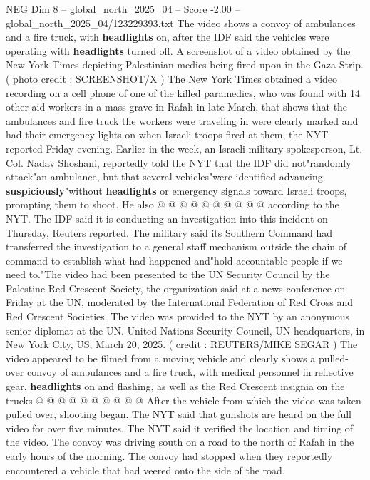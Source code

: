 \begin{textsample}{NEG Dim 8 – global\_north\_2025\_04 – Score -2.00 – global\_north\_2025\_04/123229393.txt}  \label{ex:f8_neg_083}
The video shows a convoy of ambulances and a fire truck, with \textbf{headlights} on, after the IDF said the vehicles were operating with \textbf{headlights} turned off.
A screenshot of a video obtained by the New York Times depicting Palestinian medics being fired upon in the Gaza Strip. ( photo credit : SCREENSHOT/X ) The New York Times obtained a video recording on a cell phone of one of the killed paramedics, who was found with 14 other aid workers in a mass grave in Rafah in late March, that shows that the ambulances and fire truck the workers were traveling in were clearly marked and had their emergency lights on when Israeli troops fired at them, the NYT reported Friday evening.
Earlier in the week, an Israeli military spokesperson, Lt.
Col.
Nadav Shoshani, reportedly told the NYT that the IDF did not"randomly attack"an ambulance, but that several vehicles"were identified advancing \textbf{suspiciously}"without \textbf{headlights} or emergency signals toward Israeli troops, prompting them to shoot.
He also @ @ @ @ @ @ @ @ @ @ according to the NYT.
The IDF said it is conducting an investigation into this incident on Thursday, Reuters reported.
The military said its Southern Command had transferred the investigation to a general staff mechanism outside the chain of command to establish what had happened and"hold accountable people if we need to."The video had been presented to the UN Security Council by the Palestine Red Crescent Society, the organization said at a news conference on Friday at the UN, moderated by the International Federation of Red Cross and Red Crescent Societies.
The video was provided to the NYT by an anonymous senior diplomat at the UN.
United Nations Security Council, UN headquarters, in New York City, US, March 20, 2025. ( credit : REUTERS/MIKE SEGAR ) The video appeared to be filmed from a moving vehicle and clearly shows a pulled-over convoy of ambulances and a fire truck, with medical personnel in reflective gear, \textbf{headlights} on and flashing, as well as the Red Crescent insignia on the trucks @ @ @ @ @ @ @ @ @ @ After the vehicle from which the video was taken pulled over, shooting began.
The NYT said that gunshots are heard on the full video for over five minutes.
The NYT said it verified the location and timing of the video.
The convoy was driving south on a road to the north of Rafah in the early hours of the morning.
The convoy had stopped when they reportedly encountered a vehicle that had veered onto the side of the road.

\end{textsample}
